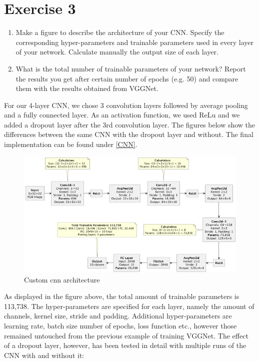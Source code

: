 \section*{Exercise 3}
\begin{enumerate}
	\item Make a figure to describe the architecture of your CNN. Specify the corresponding hyper-parameters and trainable parameters used in every layer of your network. Calculate manually the output size of each layer. 
	\item What is the total number of trainable parameters of your network? Report the results you get after certain number of epochs (e.g. 50) and compare them with the results obtained from VGGNet.

\end{enumerate}
For our 4-layer CNN, we chose 3 convolution layers followed by average pooling and a fully connected layer. As an activation function, we used ReLu and we added a dropout layer after the 3rd convolution layer. The figures below show the differences between the same CNN with the dropout layer and without. The final implementation can be found under \ref{CNN}.



\begin{figure}[htbp] 
    \centering
    \includegraphics[width=1\textwidth]{images/ex3_architecture} 
    \caption{Custom cnn architecture}
\end{figure}

As displayed in the figure above, the total amount of trainable parameters is 113,738. The hyper-parameters are specified for each layer, namely the amount of channels, kernel size, stride and padding. Additional hyper-parameters are learning rate, batch size
number of epochs, loss function etc., however those remained untouched from the previous example of training VGGNet. The effect of a dropout layer, however, has been tested in detail with multiple runs of the CNN with and without it:

